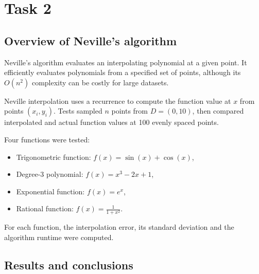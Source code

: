 \section{Task 2}

\subsection{Overview of Neville's algorithm}

Neville's algorithm evaluates an interpolating polynomial at a given point. It efficiently evaluates polynomials from a specified set of points, although its \( O(n^2) \) complexity can be costly for large datasets.

Neville interpolation uses a recurrence to compute the function value at \( x \) from points \( (x_i, y_i) \). Tests sampled \( n \) points from \( D = (0, 10) \), then compared interpolated and actual function values at 100 evenly spaced points.

Four functions were tested:
\begin{itemize}
    \item Trigonometric function: \( f(x) = \sin(x) + \cos(x) \),
    \item Degree-3 polynomial: \( f(x) = x^3 - 2x + 1 \),
    \item Exponential function: \( f(x) = e^x \),
    \item Rational function: \( f(x) = \frac{1}{1 + x^2} \).
\end{itemize}

For each function, the interpolation error, its standard deviation and the algorithm runtime were computed.

\subsection{Results and conclusions}

